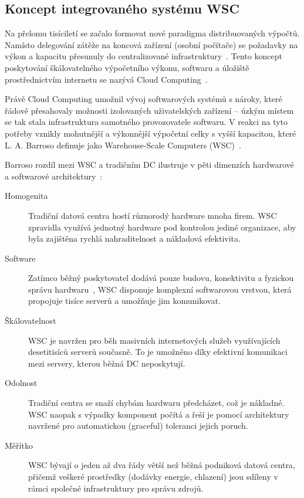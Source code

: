 \subsection{Koncept integrovaného systému WSC}
\label{subsec:wsc}

Na přelomu tisíciletí se začalo formovat nové paradigma distribuovaných výpočtů. Namísto delegování zátěže na koncová zařízení (osobní počítače) se požadavky na výkon a kapacitu přesunuly do centralizované infrastruktury~\cite{barroso_data_2026}. Tento koncept poskytování škálovatelného výpočetního výkonu, softwaru a úložiště prostřednictvím internetu se nazývá Cloud Computing~\cite{lewis_basics_2010}.

Právě Cloud Computing umožnil vývoj softwarových systémů s nároky, které řádově přesahovaly možnosti izolovaných uživatelských zařízení -- úzkým místem se tak stala infrastruktura samotného provozovatele softwaru. V reakci na tyto potřeby vznikly mohutnější a výkonnější výpočetní celky s vyšší kapacitou, které L. A. Barroso definuje jako Warehouse-Scale Computers (WSC)~\cite{barroso_data_2026, barroso_brief_2021}.

Barroso rozdíl mezi WSC a tradičním DC ilustruje v pěti dimenzích hardwarové a softwarové architektury~\cite[s.~2--4]{barroso_data_2026}:

\begin{description}
    \item[Homogenita] Tradiční datová centra hostí různorodý hardware mnoha firem. WSC zpravidla využívá jednotný hardware pod kontrolou jediné organizace, aby byla zajištěna rychlá nahraditelnost a nákladová efektivita.
    
    \item[Software] Zatímco běžný poskytovatel dodává pouze budovu, konektivitu a fyzickou správu hardwaru~\cite[s.~10]{marx_gomez_foundations_2017}, WSC disponuje komplexní softwarovou vrstvou, která propojuje tisíce serverů a umožňuje jim komunikovat.
    
    \item[Škálovatelnost] WSC je navržen pro běh masivních internetových služeb využívajících desetitisíců serverů současně. To je umožněno díky efektivní komunikaci mezi servery, kterou běžná DC neposkytují.
    
    \item[Odolnost] Tradiční centra se snaží chybám hardwaru předcházet, což je nákladné. WSC naopak s výpadky komponent počítá a řeší je pomocí architektury navržené pro automatickou (graceful) toleranci jejich poruch.
    
    \item[Měřítko] WSC bývají o jeden až dva řády větší než běžná podniková datová centra, přičemž veškeré prostředky (dodávky energie, chlazení) jsou sdíleny v rámci společné infrastruktury pro správu zdrojů.
\end{description}


